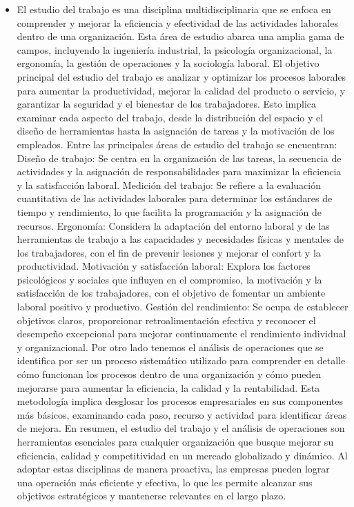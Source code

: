     \begin{itemize}
        \item El estudio del trabajo es una disciplina multidisciplinaria que se enfoca en comprender y mejorar la eficiencia y efectividad de las actividades laborales dentro de una organización. Esta área de estudio abarca una amplia gama de campos, incluyendo la ingeniería industrial, la psicología organizacional, la ergonomía, la gestión de operaciones y la sociología laboral.
    El objetivo principal del estudio del trabajo es analizar y optimizar los procesos laborales para aumentar la productividad, mejorar la calidad del producto o servicio, y garantizar la seguridad y el bienestar de los trabajadores. Esto implica examinar cada aspecto del trabajo, desde la distribución del espacio y el diseño de herramientas hasta la asignación de tareas y la motivación de los empleados.
    Entre las principales áreas de estudio del trabajo se encuentran:
    Diseño de trabajo: Se centra en la organización de las tareas, la secuencia de actividades y la asignación de responsabilidades para maximizar la eficiencia y la satisfacción laboral.
    Medición del trabajo: Se refiere a la evaluación cuantitativa de las actividades laborales para determinar los estándares de tiempo y rendimiento, lo que facilita la programación y la asignación de recursos.
    Ergonomía: Considera la adaptación del entorno laboral y de las herramientas de trabajo a las capacidades y necesidades físicas y mentales de los trabajadores, con el fin de prevenir lesiones y mejorar el confort y la productividad.
    Motivación y satisfacción laboral: Explora los factores psicológicos y sociales que influyen en el compromiso, la motivación y la satisfacción de los trabajadores, con el objetivo de fomentar un ambiente laboral positivo y productivo.
    Gestión del rendimiento: Se ocupa de establecer objetivos claros, proporcionar retroalimentación efectiva y reconocer el desempeño excepcional para mejorar continuamente el rendimiento individual y organizacional.
    Por otro lado tenemos el análisis de operaciones que se identifica por ser un proceso sistemático utilizado para comprender en detalle cómo funcionan los procesos dentro de una organización y cómo pueden mejorarse para aumentar la eficiencia, la calidad y la rentabilidad. Esta metodología implica desglosar los procesos empresariales en sus componentes más básicos, examinando cada paso, recurso y actividad para identificar áreas de mejora.
    En resumen, el estudio del trabajo y el análisis de operaciones son herramientas esenciales para cualquier organización que busque mejorar su eficiencia, calidad y competitividad en un mercado globalizado y dinámico. Al adoptar estas disciplinas de manera proactiva, las empresas pueden lograr una operación más eficiente y efectiva, lo que les permite alcanzar sus objetivos estratégicos y mantenerse relevantes en el largo plazo.

\end{itemize}
